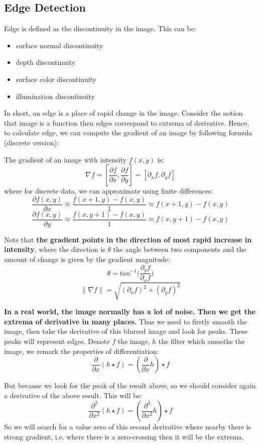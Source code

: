 \subsection{Edge Detection}
Edge is defined as the discontinuity in the image. This can be:
\begin{itemize}
	\item surface normal discontinuity
	\item depth discontinuity
	\item surface color discontinuity
	\item illumination discontinuity
\end{itemize}
In short, an edge is a place of rapid change in the image. Consider the notion that image is a function then edges correspond to extrema of derivative. Hence, to calculate edge, we can compute the gradient of an image by following formula (discrete version):
\begin{defi}
	The gradient of an image with intensity $f(x, y)$ is:
\[ \nabla f = [\frac{\partial f}{\partial x}, \frac{\partial f}{\partial y}] = [ \partial_x f, \partial_y f ] \]
where for discrete data, we can approximate using finite differences:
\[ \frac{\partial f(x, y)}{\partial x} \approx \frac{f(x+1, y) - f(x, y)}{1} \approx f(x+1,y) - f(x,y)\]
\[ \frac{\partial f(x, y)}{\partial y} \approx \frac{f(x, y+1) - f(x, y)}{1} \approx f(x,y+1) - f(x,y)\]
\end{defi}

Note that \textbf{the gradient points in the direction of most rapid increase in intensity}, where the direction is $\theta$ the angle between two components and the amount of change is given by the gradient magnitude:
\[  \theta = tan^{-1} \Big( \frac{\partial_y f}{\partial_x f}  \Big)  \]
\[  \| \nabla f  \| = \sqrt{(\partial_x f)^2 + (\partial_y f)^2}  \]

\textbf{In a real world, the image normally has a lot of noise. Then we get the extrema of derivative in many places.} Thus we need to firstly smooth the image, then take the derivative of this blurred image and look for peaks. These peaks will represent edges. Denote $f$ the image, $h$ the filter which smooths the image, we remark the properties of differentiation:
\[ 
\frac{\partial}{\partial x} (h \star f) = (\frac{\partial}{\partial x} h) \star f
\]

But because we look for the peak of the result above, so we should consider again a derivative of the above result. This will be:
\[ 
\frac{\partial^2}{\partial x^2}(h \star f) = (\frac{\partial^2}{\partial x^2}h) \star f
\]
So we will search for a value zero of this second derivative where nearby there is strong gradient, i.e. where there is a zero-crossing then it will be the extrema. 

